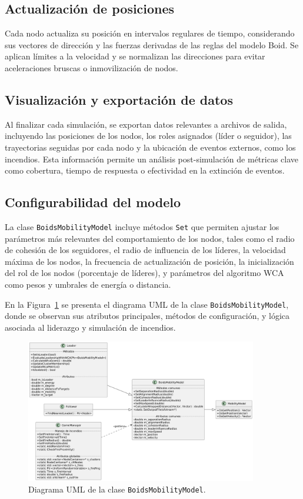 \documentclass{article}
\begin{document}
\subsection{Actualización de posiciones}

Cada nodo actualiza su posición en intervalos regulares de tiempo, considerando sus vectores de dirección y las fuerzas derivadas de las reglas del modelo Boid. Se aplican límites a la velocidad y se normalizan las direcciones para evitar aceleraciones bruscas o inmovilización de nodos.

\subsection{Visualización y exportación de datos}

Al finalizar cada simulación, se exportan datos relevantes a archivos de salida, incluyendo las posiciones de los nodos, los roles asignados (líder o seguidor), las trayectorias seguidas por cada nodo y la ubicación de eventos externos, como los incendios.
Esta información permite un análisis post-simulación de métricas clave como cobertura, tiempo de respuesta o efectividad en la extinción de eventos.

\subsection{Configurabilidad del modelo}

La clase \texttt{BoidsMobilityModel} incluye métodos \texttt{Set} que permiten ajustar los parámetros más relevantes del comportamiento de los nodos, tales como el radio de cohesión de los seguidores, el radio de influencia de los líderes, la velocidad máxima de los nodos, la frecuencia de actualización de posición, la inicialización del rol de los nodos (porcentaje de líderes), y parámetros del algoritmo WCA como pesos y umbrales de energía o distancia.

En la Figura~\ref{fig:uml-boids} se presenta el diagrama UML de la clase \texttt{BoidsMobilityModel}, donde se observan sus atributos principales, métodos de configuración, y lógica asociada al liderazgo y simulación de incendios.

\begin{figure}[H]
    \centering
    \includegraphics[width=0.9\textwidth]{class_diagram.png}
    \caption{Diagrama UML de la clase \texttt{BoidsMobilityModel}.}
    \label{fig:uml-boids}
\end{figure}
\end{document}
